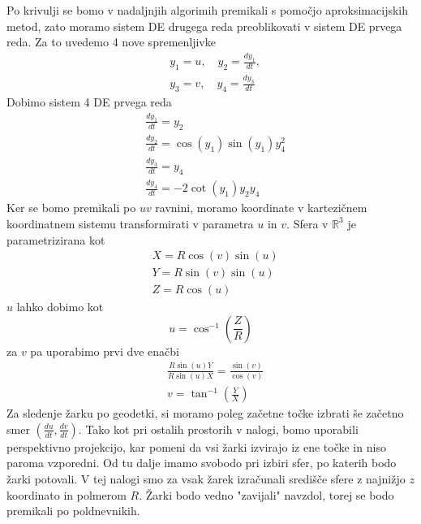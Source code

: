 \documentclass[titlepage]{article}
\begin{document}
Po krivulji se bomo v nadaljnjih algorimih premikali s pomočjo aproksimacijskih metod, zato moramo sistem DE drugega reda preoblikovati v
sistem DE prvega reda. Za to uvedemo 4 nove spremenljivke
\begin{equation}
\begin{split}
    &y_{1}=u, \quad y_{2}=\frac{dy_{1}}{dt}, \\
    &y_{3}=v, \quad y_{4}=\frac{dy_{3}}{dt}
\end{split}
\end{equation}
Dobimo sistem 4 DE prvega reda
\begin{equation} \label{e:geoSys}
\begin{split}
    &\frac{dy_{1}}{dt}=y_{2} \\
    &\frac{dy_{2}}{dt}=\cos(y_{1})\sin(y_{1})y^{2}_{4} \\
    &\frac{dy_{3}}{dt}=y_{4} \\
    &\frac{dy_{4}}{dt}=-2\cot(y_{1})y_{2}y_{4}
\end{split}
\end{equation}
Ker se bomo premikali po \( uv \) ravnini, moramo koordinate v kartezičnem koordinatnem sistemu transformirati v parametra \( u \) in \( v \). Sfera v \(\mathbb{R}^3\) je
parametrizirana kot
\begin{equation} \label{e:toXYZ}
    \begin{split}
        &X=R\cos(v)\sin(u) \\
        &Y=R\sin(v)\sin(u) \\
        &Z=R\cos(u)
    \end{split}
\end{equation}
\( u \) lahko dobimo kot
\begin{equation} \label{e:toU}
        u=\cos^{-1} \left( \frac{Z}{R} \right)
\end{equation}
za \( v \) pa uporabimo prvi dve enačbi
\begin{equation} \label{e:toV}
    \begin{split}
        &\frac{R\sin(u)Y}{R\sin(u)X}=\frac{\sin(v)}{\cos(v)} \\
        &v=\tan^{-1} \left(\frac{Y}{X} \right)
    \end{split}
\end{equation}
\newpage
Za sledenje žarku po geodetki, si moramo poleg začetne točke izbrati še začetno smer
\(\left( \frac{du}{dt}, \frac{dv}{dt} \right) \). Tako kot pri ostalih prostorih v nalogi, 
bomo uporabili perspektivno projekcijo, kar pomeni da vsi žarki izvirajo iz ene točke in 
niso paroma vzporedni. Od tu dalje imamo svobodo pri izbiri sfer, po katerih bodo žarki potovali. V tej nalogi smo za
vsak žarek izračunali središče sfere z najnižjo \( z \) koordinato in polmerom \( R \). Žarki bodo vedno "zavijali" navzdol, torej se bodo premikali po poldnevnikih.
\end{document}
